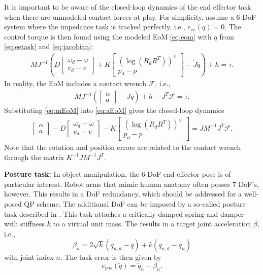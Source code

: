 \documentclass[a4paper, 10pt, conference]{ieeeconf}
\begin{document}
    It is important to be aware of the closed-loop dynamics of the end effector task when there are unmodeled contact forces at play. For simplicity, assume a 6-DoF system where the impedance task is tracked perfectly, i.e., $e_{ee}(q)=0$. The control torque is then found using the modeled EoM \eqref{eq:eom} with $\ddot{q}$ from \eqref{eq:eetask} and \eqref{eq:jacobian}:
     \begin{align} \label{eq:mEoM} MJ^{-1}
    \left(   
D \begin{bmatrix} \omega_d - {}{\omega} \\ v_d - v \end{bmatrix}  + K \begin{bmatrix}(\log({R}_dR^T))^{\vee }  \\p_d - {p}  \end{bmatrix}
-\dot{J}\dot{q}\right)+h =\tau.
      \end{align} In reality, the EoM includes a contact wrench $\mathcal{F}$, i.e., 
     \begin{align} \label{eq:aEoM} MJ^{-1} \left(
    \begin{bmatrix} \alpha \\ a \end{bmatrix}-\dot{J}\dot{q} \right ) +h -J^T\mathcal{F}=\tau.
      \end{align}
      Substituting \eqref{eq:mEoM} into \eqref{eq:aEoM} gives the closed-loop dynamics
 \begin{align} \label{eq:ee_closeloop} 
    \begin{bmatrix} \alpha \\ a \end{bmatrix}- D \begin{bmatrix} \omega_d - {}{\omega} \\ v_d - v \end{bmatrix}  - K \begin{bmatrix}(\log({R}_dR^T))^{\vee }  \\p_d - {p}  \end{bmatrix}=JM^{-1}J^T\mathcal{F}.
      \end{align}
      Note that the rotation and position errors are related to the contact wrench through the matrix $K^{-1}JM^{-1}J^T$.

    \textbf{Posture task:} In object manipulation, the 6-DoF end effector pose is of particular interest. Robot arms that mimic human anatomy often posses 7 DoF's, however. This results in a DoF redundancy, which should be addressed for a well-posed QP scheme. The additional DoF can be imposed by a so-called posture task described in \cite{cisnerosRobustHumanoidControl2018}. This task attaches a critically-damped spring and damper with stiffness $k$ to a virtual unit mass. The results in a target joint acceleration $\beta$, i.e.,
 \begin{equation} \label{eq:beta} \beta_n = 2\sqrt{k}(\dot{q}_{n,d}-\dot{q}) +k(q_{n,d}-q_n)
    \end{equation}
    with joint index $n$. The task error is then given by
    \begin{equation} \label{eq:e_pos} e_{pos}(\ddot{q}) = 
    \ddot{q}_n - \beta_n.
    \end{equation}
\end{document}
